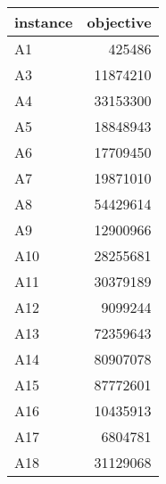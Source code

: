 \begin{tabular}{lr}
\toprule
instance &  objective \\
\midrule
      A1 &     425486 \\
      A3 &   11874210 \\
      A4 &   33153300 \\
      A5 &   18848943 \\
      A6 &   17709450 \\
      A7 &   19871010 \\
      A8 &   54429614 \\
      A9 &   12900966 \\
     A10 &   28255681 \\
     A11 &   30379189 \\
     A12 &    9099244 \\
     A13 &   72359643 \\
     A14 &   80907078 \\
     A15 &   87772601 \\
     A16 &   10435913 \\
     A17 &    6804781 \\
     A18 &   31129068 \\
\bottomrule
\end{tabular}
